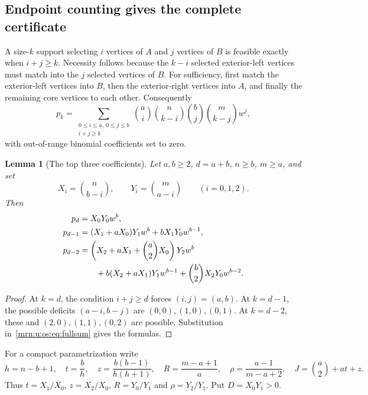 \documentclass[11pt,a4paper]{article}
\newtheorem{lemma}[theorem]{Lemma}
\theoremstyle{remark}\newtheorem{remark}[theorem]{Remark}
\begin{document}
\subsection{Endpoint counting gives the complete certificate}
A size-$k$ support selecting $i$ vertices of $A$ and $j$ vertices of $B$ is feasible exactly when $i+j\ge k$. Necessity follows because the $k-i$ selected exterior-left vertices must match into the $j$ selected vertices of $B$. For sufficiency, first match the exterior-left vertices into $B$, then the exterior-right vertices into $A$, and finally the remaining core vertices to each other. Consequently
\begin{equation}\label{mrn:u:os:eq:fullsum}
 p_k=\sum_{\substack{0\le i\le a,\ 0\le j\le b\\i+j\ge k}}
      \binom ai\binom n{k-i}\binom bj\binom m{k-j}w^j,
\end{equation}
with out-of-range binomial coefficients set to zero.

\begin{lemma}[The top three coefficients]\label{mrn:u:os:lem:top}
Let $a,b\ge2$, $d=a+b$, $n\ge b$, $m\ge a$, and set
\[
 X_i=\binom n{b-i},\qquad Y_i=\binom m{a-i}\qquad(i=0,1,2).
\]
Then
\begin{align}
 p_d&=X_0Y_0w^b,\label{mrn:u:os:eq:pd}\\
 p_{d-1}&=(X_1+aX_0)Y_1w^b+bX_1Y_0w^{b-1},\label{mrn:u:os:eq:pd1}\\
 p_{d-2}&=\left(X_2+aX_1+\binom a2X_0\right)Y_2w^b\notag\\
 &\qquad+b(X_2+aX_1)Y_1w^{b-1}+\binom b2X_2Y_0w^{b-2}.\label{mrn:u:os:eq:pd2}
\end{align}
\end{lemma}
\begin{proof}
At $k=d$, the condition $i+j\ge d$ forces $(i,j)=(a,b)$. At $k=d-1$, the possible deficits $(a-i,b-j)$ are $(0,0),(1,0),(0,1)$. At $k=d-2$, these and $(2,0),(1,1),(0,2)$ are possible. Substitution in~\eqref{mrn:u:os:eq:fullsum} gives the formulas.
\end{proof}

For a compact parametrization write
\begin{equation}\label{mrn:u:os:eq:parameters}
 h=n-b+1,\quad t=\frac bh,\quad z=\frac{b(b-1)}{h(h+1)},\quad
 R=\frac{m-a+1}{a},\quad \rho=\frac{a-1}{m-a+2},\quad
 J=\binom a2+at+z.
\end{equation}
Thus $t=X_1/X_0$, $z=X_2/X_0$, $R=Y_0/Y_1$ and $\rho=Y_2/Y_1$. Put $D=X_0Y_1>0$.
\end{document}
